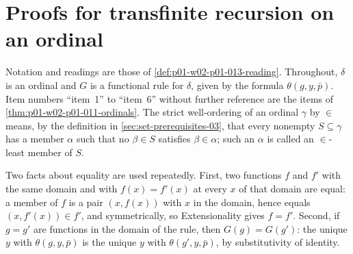 \section{Proofs for transfinite recursion on an ordinal}
\label{sec:annex-p01-w02-p01-013-transfinite-recursion}

Notation and readings are those of \cref{def:p01-w02-p01-013-reading}.
Throughout, \(\delta\) is an ordinal and \(G\) is a functional rule for
\(\delta\), given by the formula \(\theta(g,y,\bar p)\). Item numbers
``item~1'' to ``item~6'' without further reference are the items of
\cref{thm:p01-w02-p01-011-ordinals}. The strict well-ordering of an ordinal
\(\gamma\) by \(\in\) means, by the definition in
\cref{sec:set-prerequisites-03}, that every nonempty \(S\subseteq\gamma\) has
a member \(\alpha\) such that no \(\beta\in S\) satisfies \(\beta\in\alpha\);
such an \(\alpha\) is called an \(\in\)-least member of \(S\).

Two facts about equality are used repeatedly. First, two functions \(f\) and
\(f'\) with the same domain and with \(f(x)=f'(x)\) at every \(x\) of that
domain are equal: a member of \(f\) is a pair \((x,f(x))\) with \(x\) in the
domain, hence equals \((x,f'(x))\in f'\), and symmetrically, so
Extensionality gives \(f=f'\). Second, if \(g=g'\) are functions in the domain
of the rule, then \(G(g)=G(g')\): the unique \(y\) with \(\theta(g,y,\bar p)\)
is the unique \(y\) with \(\theta(g',y,\bar p)\), by substitutivity of
identity.

